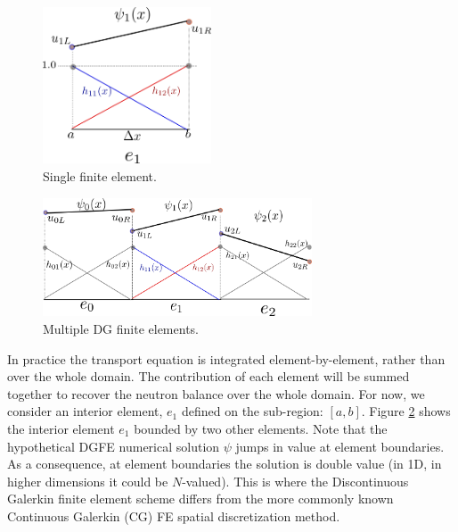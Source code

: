 \begin{figure}[!htbp]
\centering
\includegraphics[width=5cm]{images/single_ele.png}
\caption{Single finite element.}
\label{single_ele}
\end{figure}

\begin{figure}[!htbp]
\centering
\includegraphics[width=8cm]{images/multi_ele.png}
\caption{Multiple DG finite elements.}
\label{multi_ele}
\end{figure}

In practice the transport equation is integrated element-by-element, rather than over the whole domain.  The contribution of each element will be summed together to recover the neutron balance over the whole domain.  For now, we consider an interior element, $e_1$ defined on the sub-region: $[a, b]$.  Figure \ref{multi_ele} shows the interior element $e_1$ bounded by two other elements.  Note that the hypothetical DGFE numerical solution $\psi$ jumps in value at element boundaries.  As a consequence, at element boundaries the solution is double value (in 1D, in higher dimensions it could be $N$-valued).  This is where the Discontinuous Galerkin finite element scheme differs from the more commonly known Continuous Galerkin (CG) FE spatial discretization method.